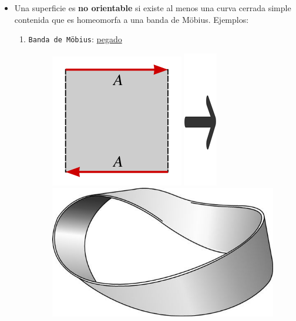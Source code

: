 \begin{itemize}
	\item  Una superficie es \textbf{no orientable} si existe al menos una curva cerrada simple contenida que es homeomorfa a una banda de Möbius. Ejemplos: 
	
	\begin{enumerate}
		\item \texttt{Banda de Möbius}: \href{https://www.youtube.com/watch?v=fCJ0mCUaEok}{pegado}
				\begin{figure}[H]
				\centering
				\includegraphics[scale=0.3]{img/idb.png}
				\qquad
				\includegraphics[scale=0.25]{img/flecha.png}
				\qquad
				\includegraphics[scale=0.3]{img/banda.png}
				

\end{figure}
\end{enumerate}
\end{itemize}
